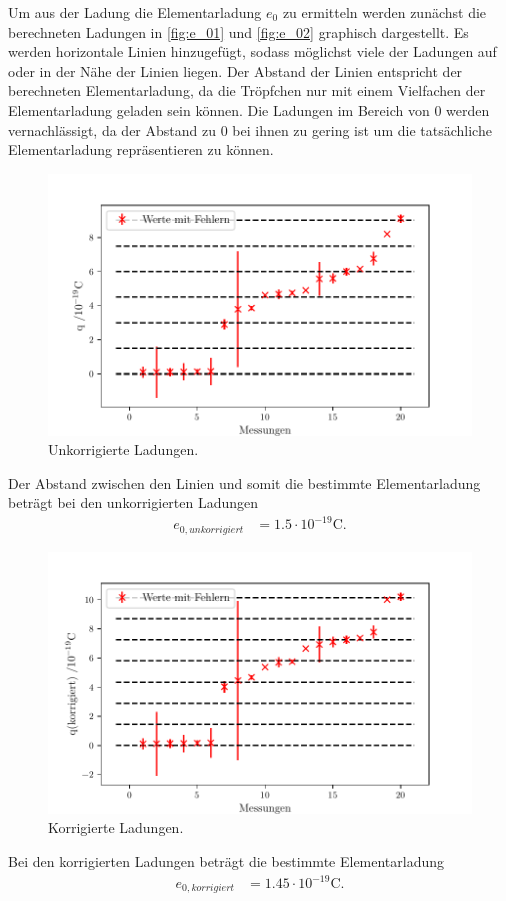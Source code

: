 Um aus der Ladung die Elementarladung $e_0$ zu ermitteln werden zunächst die berechneten Ladungen in \autoref{fig:e_01} und \autoref{fig:e_02} graphisch dargestellt.
Es werden horizontale Linien hinzugefügt, sodass möglichst viele der Ladungen auf oder in der Nähe der Linien liegen.
Der Abstand der Linien entspricht der berechneten Elementarladung, da die Tröpfchen nur mit einem Vielfachen der Elementarladung geladen sein können.
Die Ladungen im Bereich von 0 werden vernachlässigt, da der Abstand zu 0 bei ihnen zu gering ist um die tatsächliche Elementarladung repräsentieren zu können.


\begin{figure}[H]
        \centering
        \includegraphics[width=\textwidth]{build/plot2.pdf}
        \caption {Unkorrigierte Ladungen.}
        \label{fig:e_01}
\end{figure}
Der Abstand zwischen den Linien und somit die bestimmte Elementarladung beträgt bei den unkorrigierten Ladungen
\begin{align*}
        e_{0,unkorrigiert}&= 1.5\cdot 10^{-19} \unit{\coulomb}.
\end{align*}
\begin{figure}[H]
        \centering
        \includegraphics[width=\textwidth]{build/plot3.pdf}
        \caption {Korrigierte Ladungen.}
        \label{fig:e_02}
\end{figure}
Bei den korrigierten Ladungen beträgt die bestimmte Elementarladung
\begin{align*}
        e_{0,korrigiert}&= 1.45\cdot 10^{-19} \unit{\coulomb}.
\end{align*}


